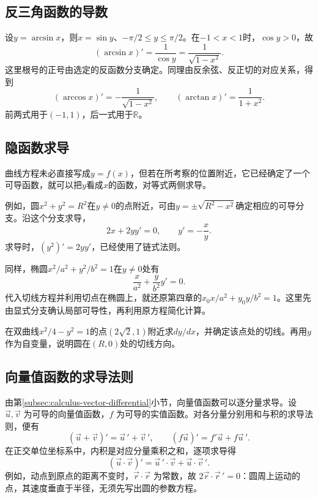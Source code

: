 \subsection{反三角函数的导数}

设\(y=\arcsin x\)，则\(x=\sin y\)、\(-\pi/2\le y\le\pi/2\)。在\(-1<x<1\)时，\(\cos y>0\)，故
\begin{equation*}
 (\arcsin x)'=\frac1{\cos y}=\frac1{\sqrt{1-x^2}}.
\end{equation*}
这里根号的正号由选定的反函数分支确定。同理由反余弦、反正切的对应关系，得到
\begin{equation*}
 (\arccos x)'=-\frac1{\sqrt{1-x^2}},\qquad
 (\arctan x)'=\frac1{1+x^2}.
\end{equation*}
前两式用于\((-1,1)\)，后一式用于\(\mathbb R\)。

\subsection{隐函数求导}

曲线方程未必直接写成\(y=f(x)\)，但若在所考察的位置附近，它已经确定了一个可导函数，就可以把\(y\)看成\(x\)的函数，对等式两侧求导。

例如，圆\(x^2+y^2=R^2\)在\(y\ne0\)的点附近，可由\(y=\pm\sqrt{R^2-x^2}\)确定相应的可导分支。沿这个分支求导，
\begin{equation*}
 2x+2yy'=0,\qquad y'=-\frac xy.
\end{equation*}
求导时，\((y^2)'=2yy'\)，已经使用了链式法则。

同样，椭圆\(x^2/a^2+y^2/b^2=1\)在\(y\ne0\)处有
\begin{equation*}
 \frac x{a^2}+\frac y{b^2}y'=0.
\end{equation*}
代入切线方程并利用切点在椭圆上，就还原第四章的\(x_0x/a^2+y_0y/b^2=1\)。这里先由显式分支确认局部可导性，再利用原方程简化计算。

\begin{example}
在双曲线\(x^2/4-y^2=1\)的点\((2\sqrt2,1)\)附近求\(dy/dx\)，并确定该点处的切线。再用\(y\)作为自变量，说明圆在\((R,0)\)处的切线方向。
\end{example}

\subsection{向量值函数的求导法则}

由第\ref{subsec:calculus-vector-differential}小节，向量值函数可以逐分量求导。设 \(\vec u,\vec v\) 为可导的向量值函数，\(f\) 为可导的实值函数。对各分量分别用和与积的求导法则，便有
\[
 (\vec u+\vec v)'=\vec u\,'+\vec v\,',\qquad
 (f\vec u)'=f'\vec u+f\vec u\,'.
\]
在正交单位坐标系中，内积是对应分量乘积之和，逐项求导得
\[
 (\vec u\cdot\vec v)'=\vec u\,'\cdot\vec v+\vec u\cdot\vec v\,'.
\]
例如，动点到原点的距离不变时，\(\vec r\cdot\vec r\) 为常数，故 \(2\vec r\cdot\vec r\,'=0\)：圆周上运动的点，其速度垂直于半径，无须先写出圆的参数方程。

